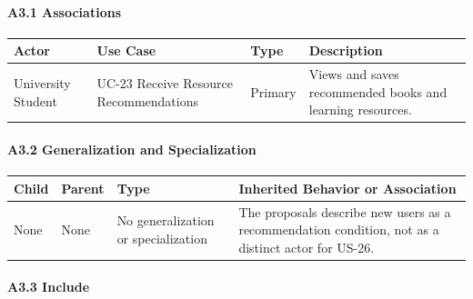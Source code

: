 \documentclass[12pt]{article}
\renewcommand{\baselinestretch}{1.5}
\begin{document}
\hypertarget{sec:a3-1-associations}{}
\paragraph*{A3.1 Associations}
\par\medskip

\begingroup
\small
\renewcommand{\baselinestretch}{1.0}\selectfont
\renewcommand{\arraystretch}{1.15}
\setlength{\tabcolsep}{6pt}
\begin{longtable}{|>{\raggedright\arraybackslash}p{}|>{\raggedright\arraybackslash}p{}|>{\raggedright\arraybackslash}p{}|>{\raggedright\arraybackslash}p{}|}
\hline
\textbf{Actor} & \textbf{Use Case} & \textbf{Type} & \textbf{Description} \\ \hline
\endhead
University Student & UC-23 Receive Resource Recommendations & Primary & Views and saves recommended books and learning resources. \\ \hline
\end{longtable}
\endgroup
\par\medskip

\hypertarget{sec:a3-2-generalization-and-specialization}{}
\paragraph*{A3.2 Generalization and Specialization}
\par\medskip

\begingroup
\small
\renewcommand{\baselinestretch}{1.0}\selectfont
\renewcommand{\arraystretch}{1.15}
\setlength{\tabcolsep}{6pt}
\begin{longtable}{|>{\raggedright\arraybackslash}p{}|>{\raggedright\arraybackslash}p{}|>{\raggedright\arraybackslash}p{}|>{\raggedright\arraybackslash}p{}|}
\hline
\textbf{Child} & \textbf{Parent} & \textbf{Type} & \textbf{Inherited Behavior or Association} \\ \hline
\endhead
None & None & No generalization or specialization & The proposals describe new users as a recommendation condition, not as a distinct actor for US-26. \\ \hline
\end{longtable}
\endgroup
\par\medskip

\hypertarget{sec:a3-3-include}{}
\paragraph*{A3.3 Include}
\par\medskip
\end{document}
